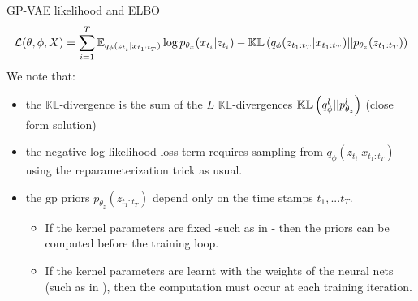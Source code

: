 \begin{frame}{GP-VAE likelihood and ELBO}
    \begin{align}
    \mathcal{L}(\theta, \phi, X) = \sum_{i=1}^T \mathbb{E}_{q_{\phi}(z_{t_i} \vert x_{t_1:t_T})} \log{p_{\theta_x}(x_{t_i} \vert z_{t_i})} - \mathbb{KL}\left( q_{\phi}(z_{t_1:t_T} \vert x_{t_1:t_T}) \vert\vert p_{\theta_z}(z_{t_1:t_T}) \right)
\end{align}
We note that:
\begin{itemize}
    \item the $\mathbb{KL}$-divergence is the sum of the $L$ $\mathbb{KL}$-divergences $\mathbb{KL}\left( q_{\phi}^l \vert\vert p_{\theta_z}^l \right)$ (close form solution)
    \item the negative log likelihood loss term requires sampling from $q_{\phi}(z_{t_i} \vert x_{t_1:t_T})$ using the reparameterization trick as usual.
    \item the \gls{gp} priors $p_{\theta_z}(z_{t_1:t_T})$ depend only on the time stamps $t_1,...t_T$. 
        \begin{itemize}
            \item If the kernel parameters are fixed -such as in \cite{fortuin_gp-vae:_2020}- then the priors can be computed before the training loop. 
            \item If the kernel parameters are learnt with the weights of the neural nets (such as in \cite{zhu_markovian_2023}), then the computation must occur at each training iteration.
        \end{itemize}
\end{itemize}
\end{frame}


